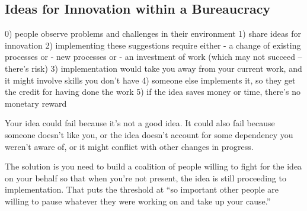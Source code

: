 \subsection{Ideas for Innovation within a Bureaucracy\label{sec:innovation}}

0) people observe problems and challenges in their environment
1) share ideas for innovation
2) implementing these suggestions require either 
    - a change of existing processes or 
    - new processes or 
    - an investment of work (which may not succeed -- there's risk)
3) implementation would take you away from your current work, and it might involve skills you don't have
4) someone else implements it, so they get the credit for having done the work
5) if the idea saves money or time, there's no monetary reward

Your idea could fail because it's not a good idea. It could also fail because someone doesn't like you, or the idea doesn't account for some dependency you weren't aware of, or it might conflict with other changes in progress.

The solution is you need to build a coalition of people willing to fight for the idea on your behalf so that when you're not present, the idea is still proceeding to implementation. That puts the threshold at ``so important other people are willing to pause whatever they were working on and take up your cause.''